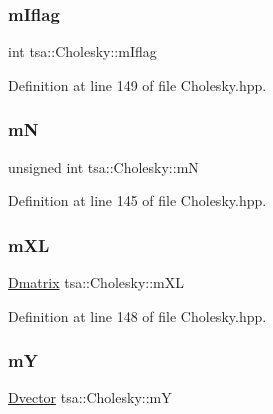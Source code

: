 \subsubsection{\texorpdfstring{m\+Iflag}{mIflag}}
{\footnotesize\ttfamily int tsa\+::\+Cholesky\+::m\+Iflag\hspace{0.3cm}{\ttfamily [private]}}



Definition at line 149 of file Cholesky.\+hpp.

\mbox{\label{classtsa_1_1_cholesky_aeebdfa1ac318dceb73fccfe75f3928bc}} 
\subsubsection{\texorpdfstring{mN}{mN}}
{\footnotesize\ttfamily unsigned int tsa\+::\+Cholesky\+::mN\hspace{0.3cm}{\ttfamily [private]}}



Definition at line 145 of file Cholesky.\+hpp.

\mbox{\label{classtsa_1_1_cholesky_a56d3135a9c56e030e9cf876fd99dbbc3}} 
\subsubsection{\texorpdfstring{m\+XL}{mXL}}
{\footnotesize\ttfamily \hyperlink{namespacetsa_ad260cd21c1891c4ed391fe788569aba4}{Dmatrix} tsa\+::\+Cholesky\+::m\+XL\hspace{0.3cm}{\ttfamily [private]}}



Definition at line 148 of file Cholesky.\+hpp.

\mbox{\label{classtsa_1_1_cholesky_a71ce7b253e3824f3629ca31ba049f58e}} 
\subsubsection{\texorpdfstring{mY}{mY}}
{\footnotesize\ttfamily \hyperlink{namespacetsa_a8900fb03d849baf447a1a0efe2561fb2}{Dvector} tsa\+::\+Cholesky\+::mY\hspace{0.3cm}{\ttfamily [private]}}



